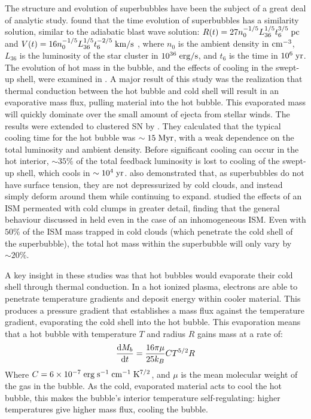 The structure and evolution of superbubbles have been the subject of a great
deal of analytic study.  \citet{Castor1975} found that the time evolution of
superbubbles has a similarity solution, similar to the \citet{Sedov1959}
adiabatic blast wave solution: $R(t)=27n_0^{-1/5}L_{36}^{1/5}t_6^{3/5}\;\rm{pc}$
and $V(t)=16n_0^{-1/5}L_{36}^{1/5}t_6^{-2/5}\;\rm{km/s}$ , where $n_0$ is the
ambient density in $\rm{cm^{-3}}$, $L_{36}$ is the luminosity of the star
cluster in $10^{36}\;\rm{erg/s}$, and $t_6$ is the time in $10^6\;\rm{yr}$.  The
evolution of hot mass in the bubble, and the effects of cooling in the swept-up
shell, were examined in \citet{Weaver1977}.  A major result of this study was
the realization that thermal conduction between the hot bubble and cold shell
will result in an evaporative mass flux, pulling material into the hot bubble.
This evaporated mass will quickly dominate over the small amount of ejecta from
stellar winds.  The \citet{Weaver1977} results were extended to clustered SN by
\citet{MacLow1988}.  They calculated that the typical cooling time for the hot
bubble was $\sim15\;\rm{Myr}$, with a weak dependence on the total luminosity
and ambient density.  Before significant cooling can occur in the hot interior,
$\sim35\%$ of the total feedback luminosity is lost to cooling of the swept-up
shell, which cools in $\sim10^4\;\rm{yr}$.  \citet{MacLow1988} also demonstrated
that, as superbubbles do not have surface tension, they are not depressurized by
cold clouds, and instead simply deform around them while continuing to expand.
\citet{Silich1996} studied the effects of an ISM permeated with cold clumps in
greater detail, finding that the general behaviour discussed in
\citet{MacLow1988} held even in the case of an inhomogeneous ISM.  Even with
$50\%$ of the ISM mass trapped in cold clouds (which penetrate the cold shell of
the superbubble), the total hot mass within the superbubble will only vary by $\sim20\%$.

A key insight in these studies was that hot bubbles would evaporate their cold
shell through thermal conduction.  In a hot ionized plasma, electrons are able
to penetrate temperature gradients and deposit energy within cooler material.
This produces a pressure gradient that establishes a mass flux against the
temperature gradient, evaporating the cold shell into the hot bubble.  This
evaporation means that a hot bubble with temperature $T$ and radius $R$ gains
mass at a rate of:
\begin{equation}
    \frac{{\rm d }M_b}{{\rm d}t} = \frac{16\pi\mu}{25k_B} CT^{5/2}R
\end{equation}
Where $C=6\times10^{-7}\;\rm{erg\;s^{-1}\;cm^{-1}\;K^{7/2}}$, and $\mu$ is the
mean molecular weight of the gas in the bubble.  As the cold, evaporated
material acts to cool the hot bubble, this makes the bubble's interior
temperature self-regulating: higher temperatures give higher mass flux, cooling
the bubble.

